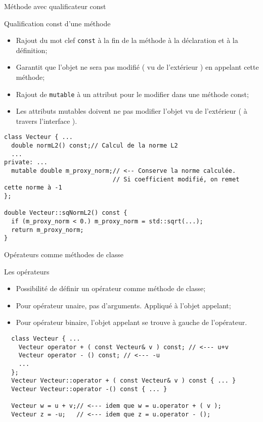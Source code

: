 \documentclass[compress,10pt,aspectratio=169]{beamer}
\begin{document}
\begin{frame}[fragile]{Méthode avec qualificateur const}
\scriptsize
\vspace*{-2mm}
\begin{block}{\small Qualification const d'une méthode}
\begin{itemize}
  \item Rajout du mot clef \texttt{const} à la fin de la méthode à la déclaration 
        et à la définition;
  \item Garantit que l'objet ne sera pas modifié ( vu de l'extérieur ) en appelant cette méthode;
  \item Rajout de \texttt{mutable} à un attribut pour le modifier dans une méthode const;
  \item Les attributs mutables doivent ne pas modifier l'objet vu de l'extérieur 
        ( à travers l'interface ).
  \end{itemize}
  \end{block}
  \begin{verbatim}
class Vecteur { ...
  double normL2() const;// Calcul de la norme L2
  ...
private: ...
  mutable double m_proxy_norm;// <-- Conserve la norme calculée. 
                              // Si coefficient modifié, on remet cette norme à -1
};

double Vecteur::sqNormL2() const {
  if (m_proxy_norm < 0.) m_proxy_norm = std::sqrt(...);
  return m_proxy_norm;
}
\end{verbatim}
\end{frame}

\begin{frame}[fragile]{Opérateurs comme méthodes de classe}
  \scriptsize
  \begin{block}{\small Les opérateurs}
  \begin{itemize}
    \item Possibilité de définir un opérateur comme méthode de classe;
    \item Pour opérateur unaire, pas d'arguments. Appliqué à l'objet appelant;
    \item Pour opérateur binaire, l'objet appelant se trouve à gauche de l'opérateur.
  \end{itemize}
  \end{block}
    
  \begin{verbatim}
  class Vecteur { ...
    Vecteur operator + ( const Vecteur& v ) const; // <--- u+v
    Vecteur operator - () const; // <--- -u
    ...
  };
  Vecteur Vecteur::operator + ( const Vecteur& v ) const { ... }
  Vecteur Vecteur::operator -() const { ... }
    
  Vecteur w = u + v;// <--- idem que w = u.operator + ( v );
  Vecteur z = -u;   // <--- idem que z = u.operator - ();
  \end{verbatim}
  \end{frame}
    
\end{document}
